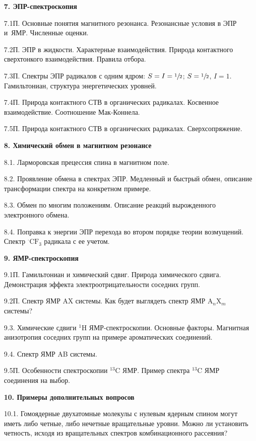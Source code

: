 \textbf{7. ЭПР-спектроскопия}\par
7.1П. Основные понятия магнитного резонанса. Резонансные условия в ЭПР и~ЯМР. Численные оценки.\par
7.2П. ЭПР в жидкости. Характерные взаимодействия. Природа контактного сверхтонкого взаимодействия. Правила отбора.\par
7.3П. Спектры ЭПР радикалов с одним ядром: $S = I = \sfrac12$; $S = \sfrac12$, $I = 1$. Гамильтониан, структура энергетических уровней.\par
7.4П. Природа контактного СТВ в органических радикалах. Косвенное взаимодействие. Соотношение Мак-Коннела.\par
7.5П. Природа контактного СТВ в органических радикалах. Сверхсопряжение.\par
\textbf{8. Химический обмен в магнитном резонансе}\par
8.1. Ларморовская прецессия спина в магнитном поле.\par
8.2. Проявление обмена в спектрах ЭПР. Медленный и быстрый обмен, описание трансформации спектра на конкретном примере.\par
8.3. Обмен по многим положениям. Описание реакций вырожденного электронного обмена.\par
8.4. Поправка к энергии ЭПР перехода во втором порядке теории возмущений. Спектр $^{\boldsymbol{\cdot}}\text{CF}_3$ радикала с ее учетом.\par
\textbf{9. ЯМР-спектроскопия}\par
9.1П. Гамильтониан и химический сдвиг. Природа химического сдвига. Демонстрация эффекта электроотрицательности соседних групп.\par
9.2П. Спектр ЯМР AX системы. Как будет выглядеть спектр ЯМР $\text{A}_n\text{X}_m$ системы?\par
9.3. Химические сдвиги $^1$H ЯМР-спектроскопии. Основные факторы. Магнитная анизотропия соседних групп на примере ароматических соединений.\par
9.4. Спектр ЯМР AB системы.\par
9.5П. Особенности спектроскопии $^{13}$C ЯМР. Пример спектра $^{13}$C ЯМР соединения на выбор.\par
\textbf{10. Примеры дополнительных вопросов}\par
10.1. Гомоядерные двухатомные молекулы с нулевым ядерным спином могут иметь либо четные, либо нечетные вращательные уровни. Можно ли установить четность, исходя из вращательных спектров комбинационного рассеяния?\par
